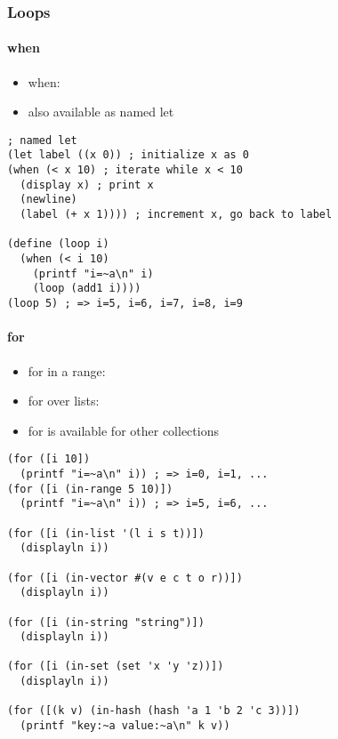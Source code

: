 \documentclass[a4paper,landscape,10pt]{article}
\begin{document}
\begin{multicols*}{2}
  \subsubsection{Loops}

  \paragraph{when}

  \begin{itemize}
    \item when: 
    \item also available as named let
  \end{itemize}

  \begin{lstlisting}[language=Racket]
; named let
(let label ((x 0)) ; initialize x as 0
(when (< x 10) ; iterate while x < 10
  (display x) ; print x
  (newline)
  (label (+ x 1)))) ; increment x, go back to label

(define (loop i)
  (when (< i 10)
    (printf "i=~a\n" i)
    (loop (add1 i))))
(loop 5) ; => i=5, i=6, i=7, i=8, i=9
  \end{lstlisting}

  \paragraph{for}

  \begin{itemize}
    \item for in a range: 
    \item for over lists: 
    \item for is available for other collections
  \end{itemize}

  \begin{lstlisting}[language=Racket]
(for ([i 10])
  (printf "i=~a\n" i)) ; => i=0, i=1, ...
(for ([i (in-range 5 10)])
  (printf "i=~a\n" i)) ; => i=5, i=6, ...

(for ([i (in-list '(l i s t))])
  (displayln i))

(for ([i (in-vector #(v e c t o r))])
  (displayln i))

(for ([i (in-string "string")])
  (displayln i))

(for ([i (in-set (set 'x 'y 'z))])
  (displayln i))

(for ([(k v) (in-hash (hash 'a 1 'b 2 'c 3))])
  (printf "key:~a value:~a\n" k v))
  \end{lstlisting}


\end{multicols*}
\end{document}
